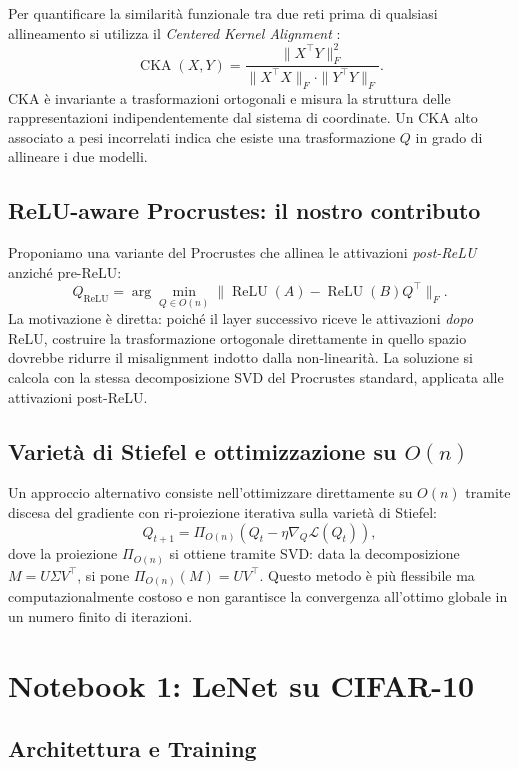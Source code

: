 \documentclass[11pt, a4paper]{article}
\begin{document}
Per quantificare la similarità funzionale tra due reti prima di qualsiasi allineamento si utilizza il \emph{Centered Kernel Alignment} \cite{kornblith2019}:
\[
\operatorname{CKA}(X, Y) = \frac{\|X^\top Y\|_F^2}{\|X^\top X\|_F \cdot \|Y^\top Y\|_F}.
\]
CKA è invariante a trasformazioni ortogonali e misura la struttura delle rappresentazioni indipendentemente dal sistema di coordinate. Un CKA alto associato a pesi incorrelati indica che esiste una trasformazione $Q$ in grado di allineare i due modelli.

\subsection{ReLU-aware Procrustes: il nostro contributo}

Proponiamo una variante del Procrustes che allinea le attivazioni \emph{post-ReLU} anziché pre-ReLU:
\[
Q_{\text{ReLU}} = \arg\min_{Q \in O(n)} \|\operatorname{ReLU}(A) - \operatorname{ReLU}(B) Q^\top\|_F.
\]
La motivazione è diretta: poiché il layer successivo riceve le attivazioni \emph{dopo} ReLU, costruire la trasformazione ortogonale direttamente in quello spazio dovrebbe ridurre il misalignment indotto dalla non-linearità. La soluzione si calcola con la stessa decomposizione SVD del Procrustes standard, applicata alle attivazioni post-ReLU.

\subsection{Varietà di Stiefel e ottimizzazione su $O(n)$}

Un approccio alternativo consiste nell'ottimizzare direttamente su $O(n)$ tramite discesa del gradiente con ri-proiezione iterativa sulla varietà di Stiefel:
\[
Q_{t+1} = \Pi_{O(n)}\!\left(Q_t - \eta \nabla_Q \mathcal{L}(Q_t)\right),
\]
dove la proiezione $\Pi_{O(n)}$ si ottiene tramite SVD: data la decomposizione $M = U\Sigma V^\top$, si pone $\Pi_{O(n)}(M) = UV^\top$. Questo metodo è più flessibile ma computazionalmente costoso e non garantisce la convergenza all'ottimo globale in un numero finito di iterazioni.

\section{Notebook 1: LeNet su CIFAR-10}

\subsection{Architettura e Training}
\end{document}
